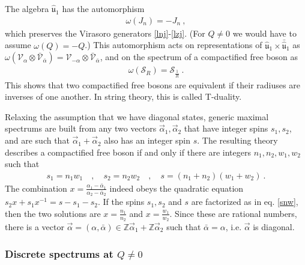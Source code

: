 \documentclass[12pt, a4paper, notitlepage, twoside]{report}
\numberwithin{equation}{section}
\theoremstyle{break}
\begin{document}
The  algebra $\hat{\mathfrak{u}}_1$ has the automorphism
\begin{align}
 \omega(J_n) = -J_n \ ,
\end{align}
which preserves the Virasoro generators \eqref{lnj}-\eqref{lzj}. (For $Q\neq 0$ we would have to assume $\omega(Q)=-Q$.)
This automorphism acts on representations of $\hat{\mathfrak{u}}_1 \times \bar{\hat{\mathfrak{u}}}_1$ as $\omega(\mathcal{V}_\alpha \otimes \bar{\mathcal{V}}_{\bar{\alpha}}) =  \mathcal{V}_{-\alpha} \otimes \bar{\mathcal{V}}_{\bar{\alpha}}$, and on the spectrum of a compactified free boson as 
\begin{align}
 \omega(\mathcal{S}_R) = \mathcal{S}_{\frac{1}{R}}\ .
\end{align}
This shows that two compactified free bosons are equivalent if their radiuses are inverses of one another. In string theory, this is called T-duality.

Relaxing the assumption that we have diagonal states, generic maximal spectrums are built from any two vectors $\vec\alpha_1,\vec\alpha_2$ that have integer spins $s_1,s_2$, and are such that $\vec\alpha_1+\vec\alpha_2$ also has an integer spin $s$. The resulting theory describes a compactified free boson if and only if there are integers $n_1,n_2,w_1,w_2$ such that
\begin{align}
 s_1=n_1w_1 \quad , \quad s_2=n_2w_2 \quad ,\quad s = (n_1+n_2)(w_1+w_2)\ .
 \label{snw}
\end{align}
The combination $x=\frac{\alpha_1-\bar{\alpha}_1}{\alpha_2-\bar{\alpha}_2}$ indeed obeys the quadratic equation 
$
 s_2x+s_1x^{-1} = s-s_1-s_2 
$. If the spins $s_1,s_2$ and $s$ are factorized as in eq. \eqref{snw}, then the two solutions are $x=\frac{n_1}{n_2}$ and $x=\frac{w_1}{w_2}$. Since these are rational numbers, there is a vector $\vec \alpha = (\alpha,\bar\alpha)\in \mathbb{Z}\vec\alpha_1 + \mathbb{Z}\vec\alpha_2$ such that $\bar\alpha =\alpha$, i.e. $\vec\alpha$ is diagonal.


\subsubsection{Discrete spectrums at $Q\neq 0$}
\end{document}
